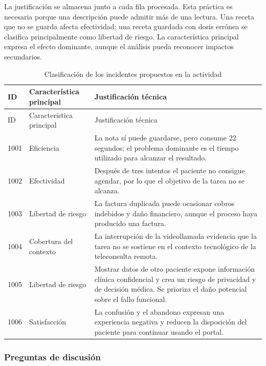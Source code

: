 La justificación se almacena junto a cada fila procesada. Esta práctica es necesaria porque una descripción puede admitir más de una lectura. Una receta que no se guarda afecta efectividad; una receta guardada con dosis errónea se clasifica principalmente como libertad de riesgo. La característica principal expresa el efecto dominante, aunque el análisis pueda reconocer impactos secundarios.

\begin{longtable}{p{0.9cm}p{2.7cm}p{8.4cm}}
\caption{Clasificación de los incidentes propuestos en la actividad}\label{tab:incidentes-seis}\\
\toprule
ID & Característica principal & Justificación técnica \\
\midrule
\endfirsthead
\toprule
ID & Característica principal & Justificación técnica \\
\midrule
\endhead
1001 & Eficiencia & La nota sí puede guardarse, pero consume 22 segundos; el problema dominante es el tiempo utilizado para alcanzar el resultado. \\
1002 & Efectividad & Después de tres intentos el paciente no consigue agendar, por lo que el objetivo de la tarea no se alcanza. \\
1003 & Libertad de riesgo & La factura duplicada puede ocasionar cobros indebidos y daño financiero, aunque el proceso haya producido una factura. \\
1004 & Cobertura del contexto & La interrupción de la videollamada evidencia que la tarea no se sostiene en el contexto tecnológico de la teleconsulta remota. \\
1005 & Libertad de riesgo & Mostrar datos de otro paciente expone información clínica confidencial y crea un riesgo de privacidad y de decisión médica. Se prioriza el daño potencial sobre el fallo funcional. \\
1006 & Satisfacción & La confusión y el abandono expresan una experiencia negativa y reducen la disposición del paciente para continuar usando el portal. \\
\bottomrule
\end{longtable}


\subsubsection{Preguntas de discusión}

